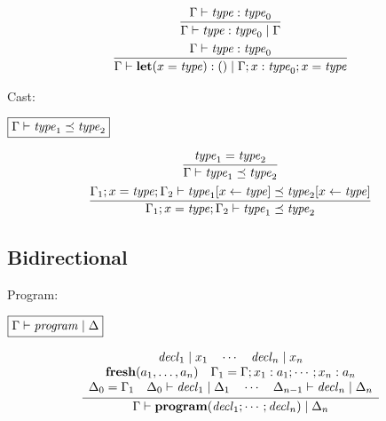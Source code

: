 \begin{gather*}
  \infer{\Gamma \vdash \mathit{type}: \mathit{type}_0 \mid \Gamma}{
    \Gamma \vdash \mathit{type}: \mathit{type}_0
  }
  \\
  \infer{\Gamma \vdash \mathbf{let}(x = \mathit{type}): () \mid \Gamma; x: \mathit{type}_0; x = \mathit{type}}{
    \Gamma \vdash \mathit{type}: \mathit{type}_0
  }
\end{gather*}

Cast:

$\fbox{$\Gamma \vdash \mathit{type}_1 \preceq \mathit{type}_2$}$

\begin{gather*}
  \infer{\Gamma \vdash \mathit{type}_1 \preceq \mathit{type}_2}{
    \mathit{type}_1 = \mathit{type}_2
  }
  \\
  \infer{\Gamma_1; x = \mathit{type}; \Gamma_2 \vdash \mathit{type}_1 \preceq \mathit{type}_2}{
    \Gamma_1; x = \mathit{type}; \Gamma_2 \vdash \mathit{type}_1[x \assign \mathit{type}] \preceq \mathit{type}_2[x \assign \mathit{type}]
  }
\end{gather*}

\subsection{Bidirectional}

Program:

$\fbox{$\Gamma \vdash \mathit{program} \mid \Delta$}$

\begin{gather*}
  \infer{\Gamma \vdash \mathbf{program}(\mathit{decl}_1; \cdots; \mathit{decl}_n) \mid \Delta_n}{
    \begin{array}{c}
      \mathit{decl}_1 \mid x_1
      \hspace{1em}
      \cdots
      \hspace{1em}
      \mathit{decl}_n \mid x_n
      \\
      \mathbf{fresh}(a_1, \ldots, a_n)
      \hspace{1em}
      \Gamma_1 = \Gamma; x_1: a_1; \cdots; x_n: a_n
      \\
      \Delta_0 = \Gamma_1
      \hspace{1em}
      \Delta_0 \vdash \mathit{decl}_1 \mid \Delta_1
      \hspace{1em}
      \cdots
      \hspace{1em}
      \Delta_{n - 1} \vdash \mathit{decl}_n \mid \Delta_n
    \end{array}
  }
\end{gather*}

